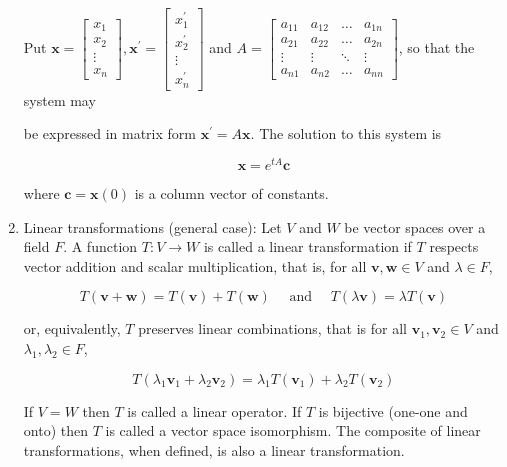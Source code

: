 \documentclass{article}
\begin{document}
\begin{enumerate}
        Put $\mathbf{x}=\left[\begin{array}{c}x_{1} \\ x_{2} \\ \vdots \\ x_{n}\end{array}\right], \mathbf{x}^{\prime}=\left[\begin{array}{c}x_{1}^{\prime} \\ x_{2}^{\prime} \\ \vdots \\ x_{n}^{\prime}\end{array}\right]$ and $A=\left[\begin{array}{cccc}a_{11} & a_{12} & \ldots & a_{1 n} \\ a_{21} & a_{22} & \ldots & a_{2 n} \\ \vdots & \vdots & \ddots & \vdots \\ a_{n 1} & a_{n 2} & \ldots & a_{n n}\end{array}\right]$, so that the system may

        be expressed in matrix form $\mathbf{x}^{\prime}=A \mathbf{x}$. The solution to this system is

        $$
        \mathbf{x}=e^{t A} \mathbf{c}
        $$

        where $\mathbf{c}=\mathbf{x}(0)$ is a column vector of constants.

        \item Linear transformations (general case): Let $V$ and $W$ be vector spaces over a field $F$. A function $T: V \rightarrow W$ is called a linear transformation if $T$ respects vector addition and scalar multiplication, that is, for all $\mathbf{v}, \mathbf{w} \in V$ and $\lambda \in F$,

        $$
        T(\mathbf{v}+\mathbf{w})=T(\mathbf{v})+T(\mathbf{w}) \quad \text { and } \quad T(\lambda \mathbf{v})=\lambda T(\mathbf{v})
        $$

        or, equivalently, $T$ preserves linear combinations, that is for all $\mathbf{v}_{1}, \mathbf{v}_{2} \in V$ and $\lambda_{1}, \lambda_{2} \in F$,

        $$
        T\left(\lambda_{1} \mathbf{v}_{1}+\lambda_{2} \mathbf{v}_{2}\right)=\lambda_{1} T\left(\mathbf{v}_{1}\right)+\lambda_{2} T\left(\mathbf{v}_{2}\right)
        $$

        If $V=W$ then $T$ is called a linear operator. If $T$ is bijective (one-one and onto) then $T$ is called a vector space isomorphism. The composite of linear transformations, when defined, is also a linear transformation.


\end{enumerate}
\end{document}
